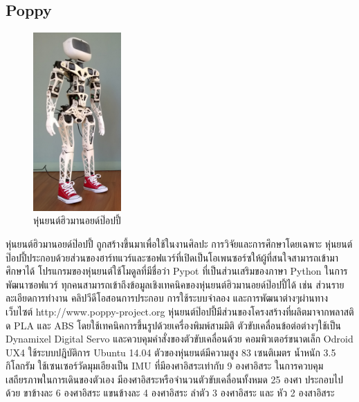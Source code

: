 \subsection*{Poppy}
\begin{figure}[htbp]
    \centering
    \includegraphics[width=0.3\textwidth]{chapter2/images/PoppyHumanoid1.png}
    \caption{หุ่นยนต์ฮิวมานอยด์ป๊อปปี้}
    \label{fig:poppy_humanoid}
\end{figure}
\hspace*{10mm} หุ่นยนต์ฮิวมานอยด์ป๊อปปี้ ถูกสร้างขึ้นมาเพื่อใช้ในงานศิลปะ การวิจัยและการศึกษาโดยเฉพาะ 
หุ่นยนต์ป๊อปปี้ประกอบด้วยส่วนของฮาร์ทแวร์และซอฟแวร์ที่เปิดเป็นโอเพนซอร์ซให้ผู้ที่สนใจสามารถเข้ามาศึกษาได้
โปรแกรมของหุ่นยนต์ใช้โมดูลที่มีชื่อว่า Pypot ที่เป็นส่วนเสริมของภาษา Python ในการพัฒนาซอฟแวร์
ทุกคนสามารถเข้าถึงข้อมูลเชิงเทคนิคของหุ่นยนต์ฮิวมานอยด์ป๊อปปี้ได้ เช่น ส่วนรายละเอียดการทำงาน
คลิปวีดีโอสอนการประกอบ การใช้ระบบจำลอง และการพัฒนาต่างๆผ่านทางเว็บไซต์ http://www.poppy-project.org 
หุ่นยนต์ป๊อปปี้มีส่วนของโครงสร้างที่ผลิตมาจากพลาสติด PLA และ ABS โดยใช้เทคนิคการขึ้นรูปด้วยเครื่องพิมพ์สามมิติ
ตัวขับเคลื่อนข้อต่อต่างๆใช้เป็น Dynamixel Digital Servo และควบคุมคำสั่งของตัวขับเคลื่อนด้วย 
คอมพิวเตอร์ขนาดเล็ก Odroid UX4 ใช้ระบบปฎิบัติการ Ubuntu 14.04 
ตัวของหุ่นยนต์มีความสูง 83 เซนติเมตร น้ำหนัก 3.5 กิโลกรัม 
ใช้เซนเซอร์วัดมุมเอียงเป็น IMU ที่มีองศาอิสระเท่ากับ 9 องศาอิสระ ในการควบคุมเสถียรภาพในการเดินของตัวเอง
มีองศาอิสระหรือจำนวนตัวขับเคลื่อนทั้งหมด 25 องศา ประกอบไปด้วย ขาข้างละ 6 องศาอิสระ แขนข้างละ 4 องศาอิสระ 
ลำตัว 3 องศาอิสระ และ หัว 2 องสาอิสระ

\clearpage
